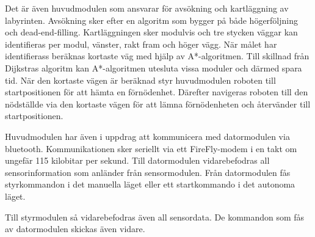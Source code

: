 \documentclass[10pt]{article}
\begin{document}
Det är även huvudmodulen som ansvarar för avsökning och kartläggning av labyrinten. Avsökning sker efter en algoritm som bygger på både högerföljning och dead-end-filling. Kartläggningen sker modulvis och tre stycken väggar kan identifieras per modul, vänster, rakt fram och höger vägg. När målet har identifierass beräknas kortaste väg med hjälp av A*-algoritmen. Till skillnad från Dijkstras algoritm kan A*-algoritmen utesluta vissa moduler och därmed spara tid. När den kortaste vägen är beräknad styr huvudmodulen roboten till startpositionen för att hämta en förnödenhet. Därefter navigeras roboten till den nödställde via den kortaste vägen för att lämna förnödenheten och återvänder till startpositionen.

Huvudmodulen har även i uppdrag att kommunicera med datormodulen via bluetooth. Kommunikationen sker seriellt via ett FireFly-modem i en takt om ungefär 115 kilobitar per sekund. Till datormodulen vidarebefodras all sensorinformation som anländer från sensormodulen. Från datormodulen fås styrkommandon i det manuella läget eller ett startkommando i det autonoma läget. 

Till styrmodulen så vidarebefodras även all sensordata. De kommandon som fås av datormodulen skickas även vidare. 
\end{document}
